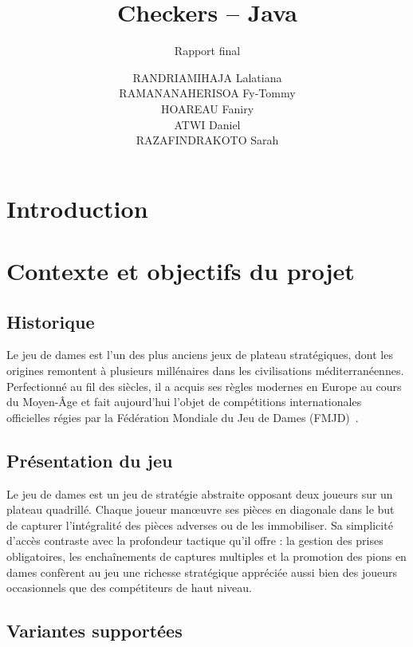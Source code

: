 \documentclass[a4paper]{article}
\title{Checkers -- Java}
\subtitle{Rapport final}
\author{%
  \parbox[t]{0.8\textwidth}{%
    \raggedright
    RANDRIAMIHAJA Lalatiana \\ RAMANANAHERISOA Fy-Tommy \\ 
    HOAREAU Faniry \\ ATWI Daniel \\ RAZAFINDRAKOTO Sarah \\
  }%
}
\begin{document}

\maketitle
\thispagestyle{empty}


\section*{Introduction}

\section{Contexte et objectifs du projet}

\subsection{Historique}

Le jeu de dames est l'un des plus anciens jeux de plateau stratégiques, dont les origines remontent à plusieurs millénaires dans 
les civilisations méditerranéennes. 
Perfectionné au fil des siècles, il a acquis ses règles modernes en Europe au cours du Moyen-Âge et fait aujourd'hui l'objet de 
compétitions internationales officielles régies par la Fédération Mondiale du Jeu de Dames (FMJD)~\cite{fmjd}.

\subsection{Présentation du jeu}
Le jeu de dames est un jeu de stratégie abstraite opposant deux joueurs sur un plateau quadrillé. 
Chaque joueur manœuvre ses pièces en diagonale dans le but de capturer l'intégralité des pièces 
adverses ou de les immobiliser. Sa simplicité d'accès contraste avec la profondeur tactique qu'il 
offre : la gestion des prises obligatoires, les enchaînements de captures multiples et la promotion 
des pions en dames confèrent au jeu une richesse stratégique appréciée aussi bien des joueurs 
occasionnels que des compétiteurs de haut niveau.

\subsection{Variantes supportées}
\label{sec:variantes}
\end{document}
